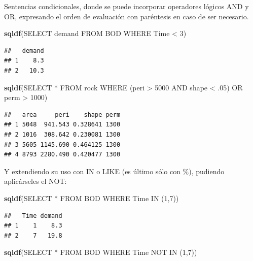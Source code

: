 \documentclass[
]{book}
\newenvironment{Shaded}{\begin{snugshade}}{\end{snugshade}}
\newcommand{\FunctionTok}[1]{\textcolor[rgb]{0.13,0.29,0.53}{\textbf{#1}}}
\newcommand{\NormalTok}[1]{#1}
\newcommand{\StringTok}[1]{\textcolor[rgb]{0.31,0.60,0.02}{#1}}
\begin{document}
Sentencias condicionales, donde se puede incorporar operadores lógicos AND y OR, expresando el orden de evaluación con paréntesis en caso de ser necesario.

\begin{Shaded}
\begin{Highlighting}[]
\FunctionTok{sqldf}\NormalTok{(}\StringTok{\textquotesingle{}SELECT demand FROM BOD WHERE Time \textless{} 3\textquotesingle{}}\NormalTok{)}
\end{Highlighting}
\end{Shaded}

\begin{verbatim}
##   demand
## 1    8.3
## 2   10.3
\end{verbatim}

\begin{Shaded}
\begin{Highlighting}[]
\FunctionTok{sqldf}\NormalTok{(}\StringTok{\textquotesingle{}SELECT * FROM rock WHERE (peri \textgreater{} 5000 AND shape \textless{} .05) OR perm \textgreater{} 1000\textquotesingle{}}\NormalTok{)}
\end{Highlighting}
\end{Shaded}

\begin{verbatim}
##   area     peri    shape perm
## 1 5048  941.543 0.328641 1300
## 2 1016  308.642 0.230081 1300
## 3 5605 1145.690 0.464125 1300
## 4 8793 2280.490 0.420477 1300
\end{verbatim}

Y extendiendo su uso con IN o LIKE (es último sólo con \%), pudiendo aplicárseles el NOT:

\begin{Shaded}
\begin{Highlighting}[]
\FunctionTok{sqldf}\NormalTok{(}\StringTok{\textquotesingle{}SELECT * FROM BOD WHERE Time IN (1,7)\textquotesingle{}}\NormalTok{)}
\end{Highlighting}
\end{Shaded}

\begin{verbatim}
##   Time demand
## 1    1    8.3
## 2    7   19.8
\end{verbatim}

\begin{Shaded}
\begin{Highlighting}[]
\FunctionTok{sqldf}\NormalTok{(}\StringTok{\textquotesingle{}SELECT * FROM BOD WHERE Time NOT IN (1,7)\textquotesingle{}}\NormalTok{)}
\end{Highlighting}
\end{Shaded}
\end{document}
